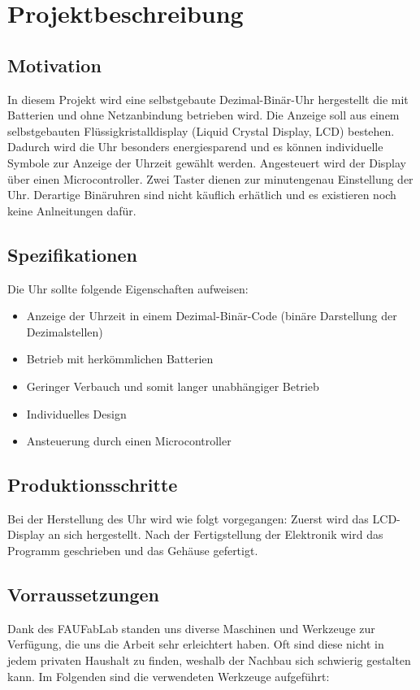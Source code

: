 \section{Projektbeschreibung}
\subsection{Motivation}
In diesem Projekt wird eine selbstgebaute Dezimal-Binär-Uhr hergestellt die mit Batterien und ohne Netzanbindung betrieben wird. Die Anzeige soll aus einem selbstgebauten Flüssigkristalldisplay (Liquid Crystal Display, LCD) bestehen. Dadurch wird die Uhr besonders energiesparend und es können individuelle Symbole zur Anzeige der Uhrzeit gewählt werden. Angesteuert wird der Display über einen Microcontroller. Zwei Taster dienen zur minutengenau Einstellung der Uhr. Derartige Binäruhren sind nicht käuflich erhätlich und es existieren noch keine Anlneitungen dafür.

\subsection{Spezifikationen}
Die Uhr sollte folgende Eigenschaften aufweisen:
\begin{itemize}
\item Anzeige der Uhrzeit in einem Dezimal-Binär-Code (binäre Darstellung der Dezimalstellen)
\item Betrieb mit herkömmlichen Batterien
\item Geringer Verbauch und somit langer unabhängiger Betrieb
\item Individuelles Design
\item Ansteuerung durch einen Microcontroller
\end{itemize}

\subsection{Produktionsschritte}

Bei der Herstellung des Uhr wird wie folgt vorgegangen: Zuerst wird das LCD-Display an sich hergestellt. Nach der Fertigstellung der Elektronik wird das Programm geschrieben und das Gehäuse gefertigt. 

\subsection{Vorraussetzungen}

Dank des FAUFabLab standen uns diverse Maschinen und Werkzeuge zur Verfügung, die uns die Arbeit sehr erleichtert haben. Oft sind diese nicht in jedem privaten Haushalt zu finden, weshalb der Nachbau sich schwierig gestalten kann.
Im Folgenden sind die verwendeten Werkzeuge aufgeführt:\\

